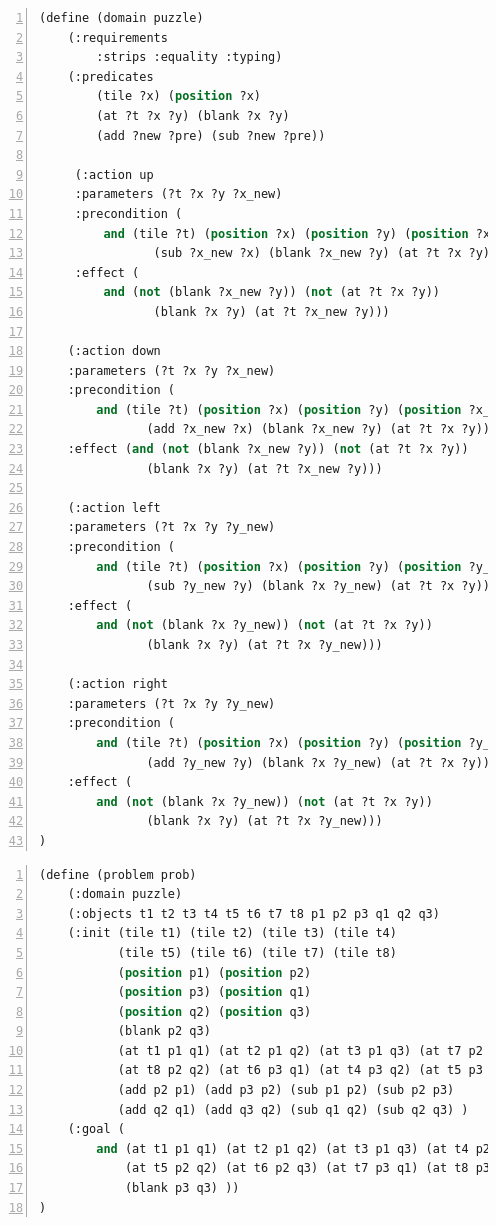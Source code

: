 \documentclass[a4paper, 11pt]{article}
\begin{document}
\begin{lstlisting}[title=domain\_puzzle.pddl,frame=single,language=lisp,numbers=left]
(define (domain puzzle)
    (:requirements
        :strips :equality :typing)
    (:predicates
        (tile ?x) (position ?x)
        (at ?t ?x ?y) (blank ?x ?y)
        (add ?new ?pre) (sub ?new ?pre))
        
     (:action up
     :parameters (?t ?x ?y ?x_new)
     :precondition (
         and (tile ?t) (position ?x) (position ?y) (position ?x_new)
        	    (sub ?x_new ?x) (blank ?x_new ?y) (at ?t ?x ?y))
     :effect (
         and (not (blank ?x_new ?y)) (not (at ?t ?x ?y))
        	    (blank ?x ?y) (at ?t ?x_new ?y)))
        	     
    (:action down
    :parameters (?t ?x ?y ?x_new)
    :precondition (
        and (tile ?t) (position ?x) (position ?y) (position ?x_new)
        	   (add ?x_new ?x) (blank ?x_new ?y) (at ?t ?x ?y))
    :effect (and (not (blank ?x_new ?y)) (not (at ?t ?x ?y))
        	   (blank ?x ?y) (at ?t ?x_new ?y)))
        	   
    (:action left
    :parameters (?t ?x ?y ?y_new)
    :precondition (
        and (tile ?t) (position ?x) (position ?y) (position ?y_new)
    	       (sub ?y_new ?y) (blank ?x ?y_new) (at ?t ?x ?y))
    :effect (
        and (not (blank ?x ?y_new)) (not (at ?t ?x ?y))
               (blank ?x ?y) (at ?t ?x ?y_new)))
               
    (:action right
    :parameters (?t ?x ?y ?y_new)
    :precondition (
        and (tile ?t) (position ?x) (position ?y) (position ?y_new)
    	       (add ?y_new ?y) (blank ?x ?y_new) (at ?t ?x ?y))
    :effect (
        and (not (blank ?x ?y_new)) (not (at ?t ?x ?y))
               (blank ?x ?y) (at ?t ?x ?y_new)))
)

\end{lstlisting}
\begin{lstlisting}[title=domain\_puzzle.pddl,frame=single,language=lisp,numbers=left]
(define (problem prob)
    (:domain puzzle)
    (:objects t1 t2 t3 t4 t5 t6 t7 t8 p1 p2 p3 q1 q2 q3)
    (:init (tile t1) (tile t2) (tile t3) (tile t4)
           (tile t5) (tile t6) (tile t7) (tile t8)
           (position p1) (position p2) 
           (position p3) (position q1) 
           (position q2) (position q3)
           (blank p2 q3)
           (at t1 p1 q1) (at t2 p1 q2) (at t3 p1 q3) (at t7 p2 q1)
           (at t8 p2 q2) (at t6 p3 q1) (at t4 p3 q2) (at t5 p3 q3)
           (add p2 p1) (add p3 p2) (sub p1 p2) (sub p2 p3)
           (add q2 q1) (add q3 q2) (sub q1 q2) (sub q2 q3) )
    (:goal (
        and (at t1 p1 q1) (at t2 p1 q2) (at t3 p1 q3) (at t4 p2 q1)
            (at t5 p2 q2) (at t6 p2 q3) (at t7 p3 q1) (at t8 p3 q2)
            (blank p3 q3) ))
)
\end{lstlisting}
\end{document}
